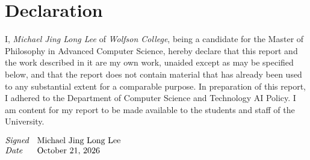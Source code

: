 \chapter*{Declaration}

I, \textit{Michael Jing Long Lee} of \textit{Wolfson College}, being a candidate for the Master of Philosophy in Advanced Computer Science, hereby declare that this report and the work described in it are my own work, unaided except as may be specified below, and that the report does not contain material that has already been used to any substantial extent for a comparable purpose. In preparation of this report, I adhered to the Department of Computer Science and Technology AI Policy. I am content for my report to be made available to the students and staff of the University.
\vspace{2cm}

\noindent$\begin{array}{@{}ll}
  \textit{Signed} & \text{Michael Jing Long Lee}\\
\textit{Date} & \text{\today}
\end{array}$